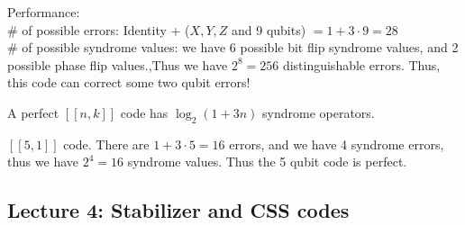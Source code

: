 Performance:\\
\# of possible errors: Identity + ($X,Y,Z$ and 9 qubits) $ = 1 + 3\cdot 9 = 28$\\
\# of possible syndrome values: we have 6 possible bit flip syndrome values, and 2 possible phase flip values.,Thus we have $2^8 = 256$ distinguishable errors. Thus, this code can correct some two qubit errors! 

\begin{definition}
    A perfect $[[n,k]]$ code has $\log_2(1+3n)$ syndrome operators.
\end{definition}
\begin{example}
    $[[5,1]]$ code. There are $1 + 3\cdot 5 = 16$ errors, and we have 4 syndrome errors, thus we have $2^4 = 16$ syndrome values. Thus the 5 qubit code is perfect. 
\end{example}



\subsection{Lecture 4: Stabilizer and CSS codes}
